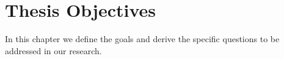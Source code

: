 \chapter{Thesis Objectives}
\label{cap:thesis_objectives}

In this chapter we define the goals and derive the specific questions to be addressed in our research.
